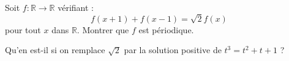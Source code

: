 Soit $f : \mathbb{R} \to \mathbb{R}$ vérifiant :
\[
f(x+1) + f(x-1) = \sqrt{2}f(x)
\]
pour tout $x$ dans $\mathbb{R}$. Montrer que $f$ est périodique.

Qu'en est-il si on remplace $\sqrt{2}$ par la solution positive de $t^3 = t^2 + t + 1$ ?
